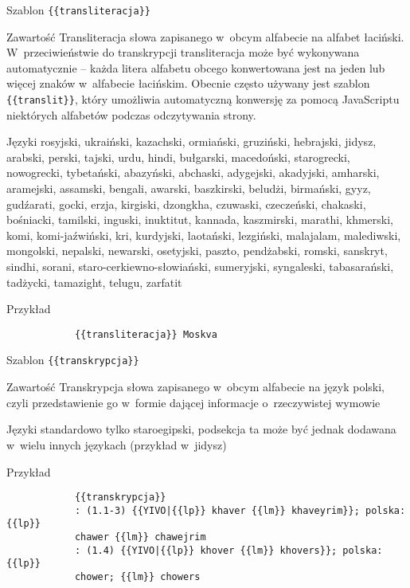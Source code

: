\documentclass{pracamgr}
\begin{document}
\begin{description-sub}
	\item[Szablon] \verb|{{transliteracja}}|
	\item[Zawartość] Transliteracja słowa zapisanego w~obcym alfabecie na alfabet łaciński. W~przeciwieństwie do transkrypcji transliteracja może być wykonywana automatycznie -- każda litera alfabetu obcego konwertowana jest na jeden lub więcej znaków w~alfabecie łacińskim. Obecnie często używany jest szablon \verb|{{translit}}|, który umożliwia automatyczną konwersję za pomocą JavaScriptu niektórych alfabetów podczas odczytywania strony.
	\item[Języki] rosyjski, ukraiński, kazachski, ormiański, gruziński, hebrajski, jidysz, arabski, perski, tajski, urdu, hindi, bułgarski, macedoński, starogrecki, nowogrecki, tybetański, abazyński, abchaski, adygejski, akadyjski, amharski, aramejski, assamski, bengali, awarski, baszkirski, beludżi, birmański, gyyz, gudźarati, gocki, erzja, kirgiski, dzongkha, czuwaski, czeczeński, chakaski, bośniacki, tamilski, inguski, inuktitut, kannada, kaszmirski, marathi, khmerski, komi, komi\hyp{}jaźwiński, kri, kurdyjski, laotański, lezgiński, malajalam, malediwski, mongolski, nepalski, newarski, osetyjski, paszto, pendżabski, romski, sanskryt, sindhi, sorani, staro-cerkiewno-słowiański, sumeryjski, syngaleski, tabasarański, tadżycki, tamazight, telugu, zarfatit
	\item[Przykład]
		\begin{verbatim}
			{{transliteracja}} Moskva
		\end{verbatim}
\end{description-sub}
\spacer
\begin{description-sub}
	\item[Szablon] \verb|{{transkrypcja}}|
	\item[Zawartość] Transkrypcja słowa zapisanego w~obcym alfabecie na język polski, czyli przedstawienie go w~formie dającej informacje o~rzeczywistej wymowie
	\item[Języki] standardowo tylko staroegipski, podsekcja ta może być jednak dodawana w~wielu innych językach (przykład w~jidysz)
	\item[Przykład]
		\begin{verbatim}
			{{transkrypcja}}
			: (1.1-3) {{YIVO|{{lp}} khaver {{lm}} khaveyrim}}; polska: {{lp}}
			chawer {{lm}} chawejrim
			: (1.4) {{YIVO|{{lp}} khover {{lm}} khovers}}; polska: {{lp}}
			chower; {{lm}} chowers
		\end{verbatim}
\end{description-sub}
\end{document}
